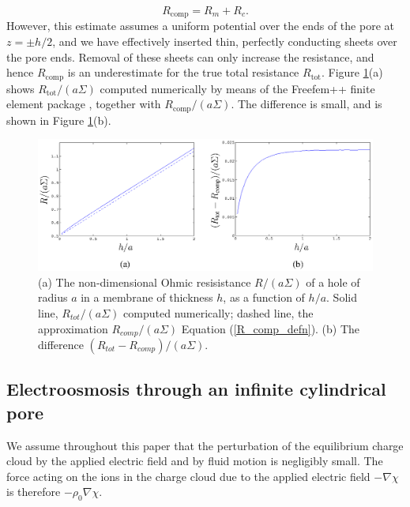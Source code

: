 \begin{equation}
R_\text{comp}=R_m+R_c.
\label{R_comp_defn}
\end{equation}
However, this estimate assumes a uniform potential over the ends of the pore at $z=\pm h/2$, and we have effectively inserted thin, perfectly conducting sheets over the pore ends. Removal of these sheets can only increase the resistance, and hence $R_\text{comp}$ is an underestimate for the true total resistance $R_\text{tot}$. Figure \ref{Fig:Rcomp}(a) shows $R_\text{tot}/(a\Sigma)$ computed numerically by means of the Freefem++ finite element package \cite{hecht2012}, together with $R_\text{comp}/(a\Sigma)$. The difference is small, and is shown in Figure \ref{Fig:Rcomp}(b).

\begin{figure}[H]
\begin{center}
\includegraphics[width=\textwidth]{finite_thickness/finite_pore_pic6.eps}
\end{center}
\caption{(a) The non-dimensional Ohmic resisistance $R/(a\Sigma)$ of a hole of radius $a$ in a membrane of thickness $h$, as a function of
$h/a$. Solid line, $R_{tot}/(a\Sigma)$ computed numerically; dashed line, the approximation $R_{comp}/(a\Sigma)$ Equation (\ref{R_comp_defn}). (b) The difference $(R_{tot}-R_{comp})/(a\Sigma)$.}
\label{Fig:Rcomp}
\end{figure}

\subsection{Electroosmosis through an infinite cylindrical pore}
We assume throughout this paper that the perturbation of the equilibrium charge cloud by the applied electric field and by fluid motion is negligibly small. The force acting on the ions in the charge cloud due to the applied electric field $-\nabla\chi$ is therefore $-\rho_0\nabla\chi$.

